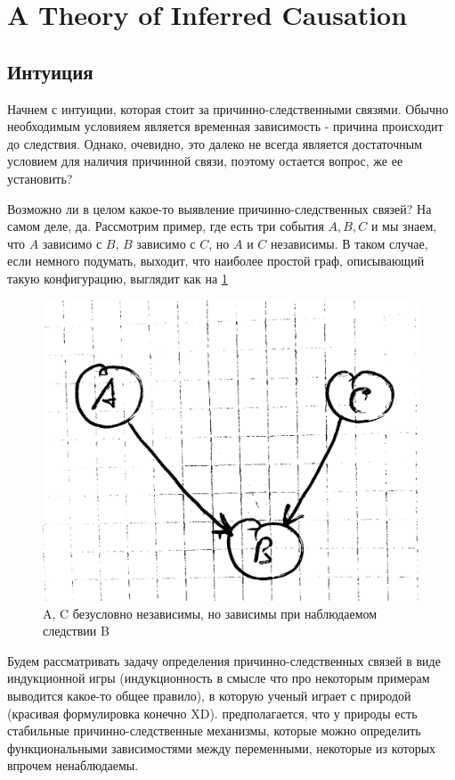 \documentclass[fleqn]{article}
\begin{document}
\section*{A Theory of Inferred Causation}

\subsection*{Интуиция}
Начнем с интуиции, которая стоит за причинно-следственными связями. Обычно необходимым условияем является временная зависимость - причина происходит до следствия. Однако, очевидно, это далеко не всегда является достаточным условием для наличия причинной связи, поэтому остается вопрос, же ее установить?

Возможно ли в целом какое-то выявление причинно-следственных связей? На самом деле, да. Рассмотрим пример, где есть три события $A, B, C$ и мы знаем, что $A$ зависимо с $B$, $B$ зависимо с $C$, но $A$ и $C$ независимы. В таком случае, если немного подумать, выходит, что наиболее простой граф, описывающий такую конфигурацию, выглядит как на \ref{fig:abc}


\begin{figure}[h]
	\begin{center}
	\includegraphics[scale=0.1]{imgs/img1.png}
	\end{center}
	\caption{A, C безусловно независимы, но зависимы при наблюдаемом следствии B}
	\label{fig:abc}
\end{figure}

Будем рассматривать задачу определения причинно-следственных связей в виде индукционной игры (индукционность в смысле что про некоторым примерам выводится какое-то общее правило), в которую ученый играет с природой (красивая формулировка конечно XD). предполагается, что у природы есть стабильные причинно-следственные механизмы, которые можно определить функциональными зависимостями между переменными, некоторые из которых впрочем ненаблюдаемы.
\end{document}
